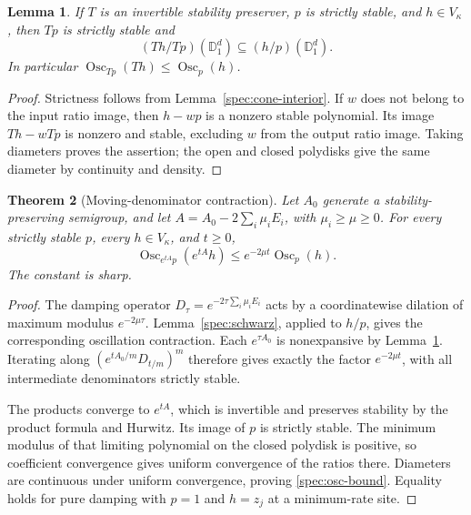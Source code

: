 \documentclass[reqno]{amsart}
\newtheorem{theorem}{Theorem}[section]
\newtheorem{lemma}[theorem]{Lemma}
\theoremstyle{definition}
\theoremstyle{remark}
\newcommand{\D}{\mathbb D}
\begin{document}
\begin{lemma}\label{spec:range-exclusion}
If \(T\) is an invertible stability preserver, \(p\) is strictly
stable, and \(h\in V_\kappa\), then \(Tp\) is strictly stable and
\[
 (Th/Tp)(\D_1^d)\subseteq(h/p)(\D_1^d).
\]
In particular \(\operatorname{Osc}_{Tp}(Th)\le
\operatorname{Osc}_p(h)\).
\end{lemma}
\begin{proof}
Strictness follows from Lemma~\ref{spec:cone-interior}.  If \(w\)
does not belong to the input ratio image, then \(h-wp\) is a nonzero
stable polynomial.  Its image \(Th-wTp\) is nonzero and stable,
excluding \(w\) from the output ratio image.  Taking diameters proves
the assertion; the open and closed polydisks give the same diameter by
continuity and density.
\end{proof}

\begin{theorem}[Moving-denominator contraction]\label{spec:oscillation}
Let \(A_0\) generate a stability-preserving semigroup, and let
\(A=A_0-2\sum_i\mu_iE_i\), with \(\mu_i\ge\mu\ge0\).
For every strictly stable \(p\), every \(h\in V_\kappa\), and
\(t\ge0\),
\begin{equation}\label{spec:osc-bound}
 \operatorname{Osc}_{e^{tA}p}(e^{tA}h)
 \le e^{-2\mu t}\operatorname{Osc}_p(h).
\end{equation}
The constant is sharp.
\end{theorem}
\begin{proof}
The damping operator \(D_\tau=e^{-2\tau\sum_i\mu_iE_i}\) acts
by a coordinatewise dilation of maximum modulus \(e^{-2\mu\tau}\).
Lemma~\ref{spec:schwarz}, applied to \(h/p\), gives the corresponding
oscillation contraction.  Each \(e^{\tau A_0}\) is nonexpansive by
Lemma~\ref{spec:range-exclusion}.  Iterating along
\((e^{tA_0/m}D_{t/m})^m\) therefore gives exactly the factor
\(e^{-2\mu t}\), with all intermediate denominators strictly stable.

The products converge to \(e^{tA}\), which is invertible and preserves
stability by the product formula and Hurwitz.  Its image of \(p\)
is strictly stable.  The minimum modulus of that limiting polynomial
on the closed polydisk is positive, so coefficient convergence gives
uniform convergence of the ratios there.  Diameters are continuous
under uniform convergence, proving \eqref{spec:osc-bound}.  Equality
holds for pure damping with \(p=1\) and \(h=z_j\) at a minimum-rate
site.
\end{proof}
\end{document}
